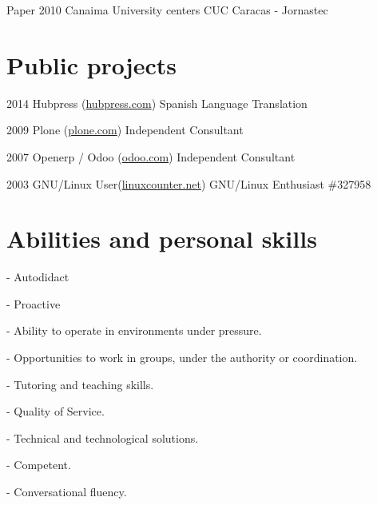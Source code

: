 \documentclass{tccv}
\begin{document}
\begin{cyp}

\item[Paper]{2010}
     {Canaima University centers}
     {CUC Caracas - Jornastec} 

\end{cyp}

\section{Public projects}

\begin{proyectos}

\item{2014}
     {Hubpress (\href{https://www.hubpress.com/}{hubpress.com})}
     {Spanish Language Translation}

\item{2009}
     {Plone (\href{https://plone.org/support/providers/javier-leon}{plone.com})}
     {Independent Consultant}

\item{2007}
     {Openerp / Odoo (\href{http://www.odoo.com/}{odoo.com})}
     {Independent Consultant}

\item{2003}
     {GNU/Linux User(\href{http://linuxcounter.net/user/327958.html}{linuxcounter.net})}
     {GNU/Linux Enthusiast \#327958}
 
\end{proyectos}

\section{Abilities and personal skills}

\begin{habilidades}

\item{- Autodidact} \\ 
\item{- Proactive} \\ 
\item{- Ability to operate in environments under pressure.} \\
\item{- Opportunities to work in groups, under the authority or coordination.} \\
\item{- Tutoring and teaching skills.} \\
\item{- Quality of Service.} \\
\item{- Technical and technological solutions.} \\
\item{- Competent.} \\
\item{- Conversational fluency.} \\

\end{habilidades}
\end{document}
